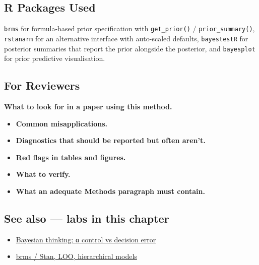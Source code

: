 \documentclass[
]{article}
\providecommand{\tightlist}{%
  \setlength{\itemsep}{0pt}\setlength{\parskip}{0pt}}
\begin{document}
\subsection{R Packages Used}\label{r-packages-used}

\texttt{brms} for formula-based prior specification with
\texttt{get\_prior()} / \texttt{prior\_summary()}, \texttt{rstanarm} for
an alternative interface with auto-scaled defaults, \texttt{bayestestR}
for posterior summaries that report the prior alongside the posterior,
and \texttt{bayesplot} for prior predictive visualisation.

\subsection{For Reviewers}\label{for-reviewers}

\textbf{What to look for in a paper using this method.}

\begin{itemize}
\tightlist
\item
  \textbf{Common misapplications.}
\item
  \textbf{Diagnostics that should be reported but often aren't.}
\item
  \textbf{Red flags in tables and figures.}
\item
  \textbf{What to verify.}
\item
  \textbf{What an adequate Methods paragraph must contain.}
\end{itemize}

\subsection{See also --- labs in this
chapter}\label{see-also-labs-in-this-chapter}

\begin{itemize}
\tightlist
\item
  \href{labs/lab-bayesian-thinking-control-vs-decision-error.Rmd}{Bayesian
  thinking; α control vs decision error}
\item
  \href{labs/lab-brms-stan-loo-hierarchical-models.Rmd}{brms / Stan,
  LOO, hierarchical models}
\end{itemize}
\end{document}
